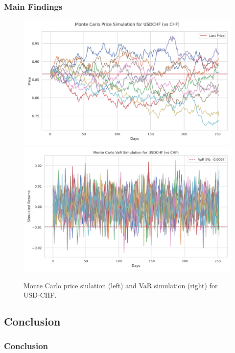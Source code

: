 \documentclass[10pt]{beamer}
\begin{document}
\begin{frame}
\frametitle{Main Findings}
\begin{figure}
    \centering  \includegraphics[width=0.48\linewidth]{reports/figures/monte_carlo_price_simulation_USDCHF_vs_CHF.png}  \label{fig:monte_carlo_price_simulation_USDCHF_vs_CHF}
    \includegraphics[width=0.49\linewidth]{reports/figures/monte_carlo_var_simulation_USDCHF_vs_CHF.png}  \label{fig:monte_carlo_var_simulation_USDCHF_vs_CHF}
    \caption{\footnotesize Monte Carlo price siulation (left) and VaR simulation (right) for USD-CHF.}
\end{figure}
\end{frame}
\begin{frame}
\section{Conclusion}
\frametitle{Conclusion}

\end{frame}
\end{document}
